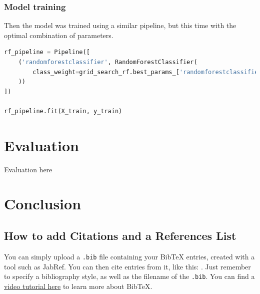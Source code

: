 \documentclass{article}
\begin{document}
\subsubsection{Model training}
Then the model was trained using a similar pipeline, but this time with the optimal combination of parameters.

\begin{lstlisting}[language=Python]
rf_pipeline = Pipeline([
    ('randomforestclassifier', RandomForestClassifier(
        class_weight=grid_search_rf.best_params_['randomforestclassifier__class_weight']
    ))
])

rf_pipeline.fit(X_train, y_train)
\end{lstlisting}

\section{Evaluation}

Evaluation here

\section{Conclusion}




\iffalse
\subsection{How to add Citations and a References List}

You can simply upload a \verb|.bib| file containing your BibTeX entries, created with a tool such as JabRef. You can then cite entries from it, like this: \cite{greenwade93}. Just remember to specify a bibliography style, as well as the filename of the \verb|.bib|. You can find a \href{https://www.overleaf.com/help/97-how-to-include-a-bibliography-using-bibtex}{video tutorial here} to learn more about BibTeX.
\end{document}
